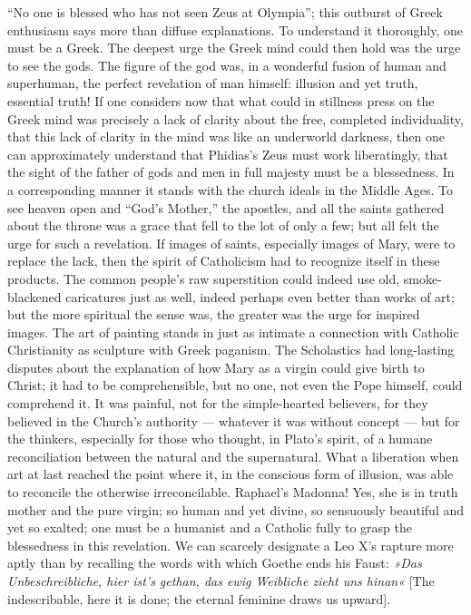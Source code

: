 \documentclass[12pt]{book}
\begin{document}
``No one is blessed who has not seen Zeus at Olympia''; this outburst of Greek enthusiasm says
more than diffuse explanations. To understand it thoroughly, one must be a Greek. The deepest
urge the Greek mind could then hold was the urge to see the gods. The figure of the god was, in
a wonderful fusion of human and superhuman, the perfect revelation of man himself: illusion and
yet truth, essential truth! If one considers now that what could in stillness press on the Greek
mind was precisely a lack of clarity about the free, completed individuality, that this lack of
clarity in the mind was like an underworld darkness, then one can approximately understand that
Phidias's Zeus must work liberatingly, that the sight of the father of gods and men in full
majesty must be a blessedness. In a corresponding manner it stands with the church ideals in the
Middle Ages. To see heaven open and ``God's Mother,'' the apostles, and all the saints gathered
about the throne was a grace that fell to the lot of only a few; but all felt the urge for such a
revelation. If images of saints, especially images of Mary, were to replace the lack, then the
spirit of Catholicism had to recognize itself in these products. The common people's raw
superstition could indeed use old, smoke-blackened caricatures just as well, indeed perhaps even
better than works of art; but the more spiritual the sense was, the greater was the urge for
inspired images. The art of painting stands in just as intimate a connection with Catholic
Christianity as sculpture with Greek paganism. The Scholastics had long-lasting disputes about
the explanation of how Mary as a virgin could give birth to Christ; it had to be comprehensible,
but no one, not even the Pope himself, could comprehend it. It was painful, not for the
simple-hearted believers, for they believed in the Church's authority --- whatever it was without
concept --- but for the thinkers, especially for those who thought, in Plato's spirit, of a
humane reconciliation between the natural and the supernatural. What a liberation when art at
last reached the point where it, in the conscious form of illusion, was able to reconcile the
otherwise irreconcilable. Raphael's Madonna! Yes, she is in truth mother and the pure virgin; so
human and yet divine, so sensuously beautiful and yet so exalted; one must be a humanist and a
Catholic fully to grasp the blessedness in this revelation. We can scarcely designate a Leo X's
rapture more aptly than by recalling the words with which Goethe ends his Faust: \textit{»Das
Unbeschreibliche, hier ist's gethan, das ewig Weibliche zieht uns hinan«} [The indescribable,
here it is done; the eternal feminine draws us upward].
\end{document}
